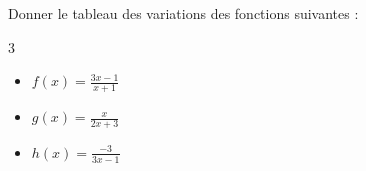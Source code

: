 \begin{Application}
Donner le tableau des variations des fonctions suivantes :
\begin{multicols}{3}
    \begin{itemize}
    \item $f(x) = \frac{3x-1}{x+1}$ 
    \item $g(x) = \frac{x}{2x+3}$ 
    \item $h(x) = \frac{-3}{3x-1}$
\end{itemize}
\end{multicols}
\end{Application}
